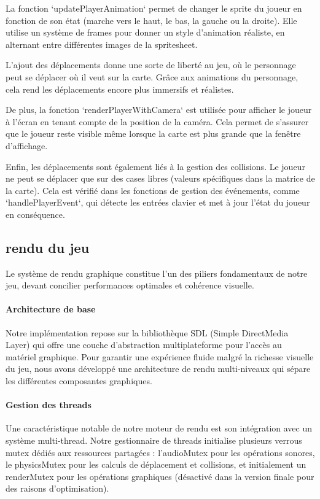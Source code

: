 \documentclass[12pt,a4paper, twoside]{article}
\begin{document}
    La fonction `updatePlayerAnimation` permet de changer le sprite du joueur en fonction de son état (marche vers le haut, le bas, la gauche ou la droite). Elle utilise un système de frames pour donner un style d'animation réaliste, en alternant entre différentes images de la spritesheet.
    \newline

    L'ajout des déplacements donne une sorte de liberté au jeu, où le personnage peut se déplacer où il veut sur la carte. Grâce aux animations du personnage, cela rend les déplacements encore plus immersifs et réalistes.
    \newline

    De plus, la fonction `renderPlayerWithCamera` est utilisée pour afficher le joueur à l'écran en tenant compte de la position de la caméra. Cela permet de s'assurer que le joueur reste visible même lorsque la carte est plus grande que la fenêtre d'affichage.
    \newline

    Enfin, les déplacements sont également liés à la gestion des collisions. Le joueur ne peut se déplacer que sur des cases libres (valeurs spécifiques dans la matrice de la carte). Cela est vérifié dans les fonctions de gestion des événements, comme `handlePlayerEvent`, qui détecte les entrées clavier et met à jour l'état du joueur en conséquence.

\newpage
\subsection{rendu du jeu}
Le système de rendu graphique constitue l'un des piliers fondamentaux de notre jeu, devant concilier performances optimales et cohérence visuelle.

\paragraph{Architecture de base} Notre implémentation repose sur la bibliothèque SDL (Simple DirectMedia Layer) qui offre une couche d'abstraction multiplateforme pour l'accès au matériel graphique. Pour garantir une expérience fluide malgré la richesse visuelle du jeu, nous avons développé une architecture de rendu multi-niveaux qui sépare les différentes composantes graphiques.

\paragraph{Gestion des threads} Une caractéristique notable de notre moteur de rendu est son intégration avec un système multi-thread. Notre gestionnaire de threads initialise plusieurs verrous mutex dédiés aux ressources partagées : l'audioMutex pour les opérations sonores, le physicsMutex pour les calculs de déplacement et collisions, et initialement un renderMutex pour les opérations graphiques (désactivé dans la version finale pour des raisons d'optimisation).
\end{document}
